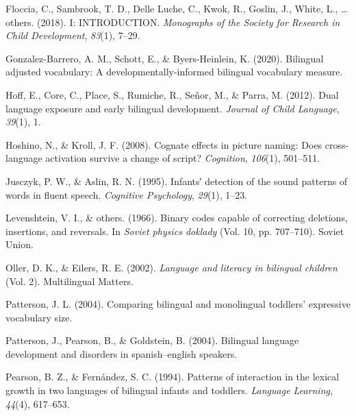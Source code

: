 \documentclass[
  english,
  man,man,floatsintext]{apa6}
\newlength{\cslhangindent}
\newenvironment{CSLReferences}[2] %
 {%
  \setlength{\parindent}{0pt}
  \ifodd #1 \everypar{\setlength{\hangindent}{\cslhangindent}}\ignorespaces\fi
  \ifnum #2 > 0
  \setlength{\parskip}{#2\baselineskip}
  \fi
 }%
 {}
\begin{document}
\begin{CSLReferences}{1}{0}
\leavevmode{}%
Floccia, C., Sambrook, T. D., Delle Luche, C., Kwok, R., Goslin, J., White, L., \ldots{} others. (2018). I: INTRODUCTION. \emph{Monographs of the Society for Research in Child Development}, \emph{83}(1), 7--29.

\leavevmode{}%
Gonzalez-Barrero, A. M., Schott, E., \& Byers-Heinlein, K. (2020). Bilingual adjusted vocabulary: A developmentally-informed bilingual vocabulary measure.

\leavevmode{}%
Hoff, E., Core, C., Place, S., Rumiche, R., Señor, M., \& Parra, M. (2012). Dual language exposure and early bilingual development. \emph{Journal of Child Language}, \emph{39}(1), 1.

\leavevmode{}%
Hoshino, N., \& Kroll, J. F. (2008). Cognate effects in picture naming: Does cross-language activation survive a change of script? \emph{Cognition}, \emph{106}(1), 501--511.

\leavevmode{}%
Jusczyk, P. W., \& Aslin, R. N. (1995). Infants′ detection of the sound patterns of words in fluent speech. \emph{Cognitive Psychology}, \emph{29}(1), 1--23.

\leavevmode{}%
Levenshtein, V. I., \& others. (1966). Binary codes capable of correcting deletions, insertions, and reversals. In \emph{Soviet physics doklady} (Vol. 10, pp. 707--710). Soviet Union.

\leavevmode{}%
Oller, D. K., \& Eilers, R. E. (2002). \emph{Language and literacy in bilingual children} (Vol. 2). Multilingual Matters.

\leavevmode{}%
Patterson, J. L. (2004). Comparing bilingual and monolingual toddlers' expressive vocabulary size.

\leavevmode{}%
Patterson, J., Pearson, B., \& Goldstein, B. (2004). Bilingual language development and disorders in spanish--english speakers.

\leavevmode{}%
Pearson, B. Z., \& Fernández, S. C. (1994). Patterns of interaction in the lexical growth in two languages of bilingual infants and toddlers. \emph{Language Learning}, \emph{44}(4), 617--653.


\end{CSLReferences}
\end{document}
